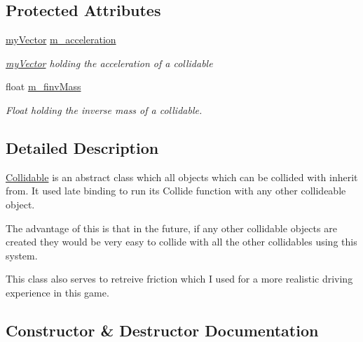\subsection*{Protected Attributes}
\begin{DoxyCompactItemize}
\item 
\hypertarget{class_collidable_aacad0202ea0d4f51a6875bce682ff3eb}{}\hyperlink{classmy_vector}{my\+Vector} \hyperlink{class_collidable_aacad0202ea0d4f51a6875bce682ff3eb}{m\+\_\+acceleration}\label{class_collidable_aacad0202ea0d4f51a6875bce682ff3eb}

\begin{DoxyCompactList}\small\item\em \hyperlink{classmy_vector}{my\+Vector} holding the acceleration of a collidable \end{DoxyCompactList}\item 
\hypertarget{class_collidable_a729958861685b10ff9718a24fca09c8e}{}float \hyperlink{class_collidable_a729958861685b10ff9718a24fca09c8e}{m\+\_\+finv\+Mass}\label{class_collidable_a729958861685b10ff9718a24fca09c8e}

\begin{DoxyCompactList}\small\item\em Float holding the inverse mass of a collidable. \end{DoxyCompactList}\end{DoxyCompactItemize}


\subsection{Detailed Description}
\hyperlink{class_collidable}{Collidable} is an abstract class which all objects which can be collided with inherit from. It used late binding to run its Collide function with any other collideable object.

The advantage of this is that in the future, if any other collidable objects are created they would be very easy to collide with all the other collidables using this system.

This class also serves to retreive friction which I used for a more realistic driving experience in this game. 

\subsection{Constructor \& Destructor Documentation}
\hypertarget{class_collidable_a92ce9e2b08086bb2f466168ffc69c9ed}{}
